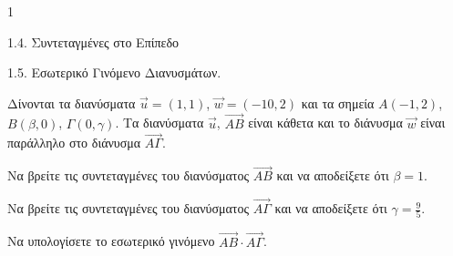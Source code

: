 \begin{ylh}{1}
    \item 1.4. Συντεταγμένες στο Επίπεδο
    \item 1.5. Εσωτερικό Γινόμενο Διανυσμάτων.
\end{ylh}
Δίνονται τα διανύσματα $\vec{u} = (1,1)$, $\vec{w} = (-10,2)$ και τα σημεία $A(-1,2)$, $B(\beta, 0)$, $\Gamma(0, \gamma)$.
Τα διανύσματα $\vec{u}$, $\overrightarrow{AB}$ είναι κάθετα και το διάνυσμα $\vec{w}$ είναι παράλληλο στο διάνυσμα $\overrightarrow{A\Gamma}$.
\begin{alist}
\item Να βρείτε τις συντεταγμένες του διανύσματος $\overrightarrow{AB}$ και να αποδείξετε ότι $\beta = 1$. 
\item Να βρείτε τις συντεταγμένες του διανύσματος $\overrightarrow{A\Gamma}$ και να αποδείξετε ότι $\gamma = \frac{9}{5}$. 
\item Να υπολογίσετε το εσωτερικό γινόμενο $\overrightarrow{AB} \cdot \overrightarrow{A\Gamma}$. 
\end{alist}